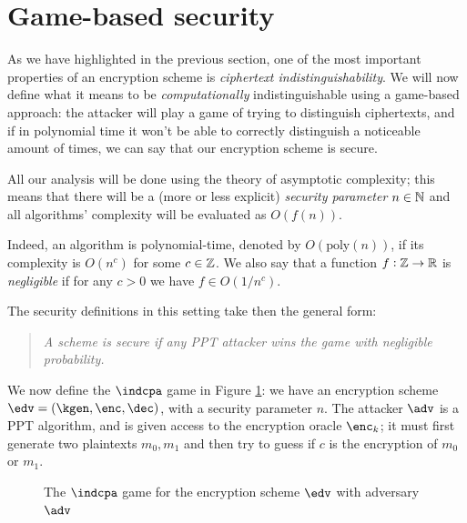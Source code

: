 \section{Game-based security}
As we have highlighted in the previous section, one of the most important properties of an encryption scheme is \emph{ciphertext indistinguishability}. We will now define what it means to be \emph{computationally} indistinguishable using a game-based approach: the attacker will play a game of trying to distinguish ciphertexts, and if in polynomial time it won't be able to correctly distinguish a noticeable amount of times, we can say that our encryption scheme is secure.

All our analysis will be done using the theory of asymptotic complexity; this means that there will be a (more or less explicit) \emph{security parameter} $n\in\mathbb{N}$ and all algorithms' complexity will be evaluated as $O(f(n))$.

Indeed, an algorithm is polynomial-time, denoted by $O(\text{poly}(n))$, if its complexity is $O(n^c)$ for some $c\in\mathbb{Z}$. We also say that a function $f:\mathbb{Z}\to\mathbb{R}$ is \emph{negligible} if for any $c>0$ we have $f\in O(1/n^c)$.

The security definitions in this setting take then the general form:

\begin{quote}
    \textit{A scheme is \emph{secure} if any PPT attacker wins the game with negligible probability.}
\end{quote}

We now define the $\indcpa$ game in Figure \ref{game_indcpa}: we have an encryption scheme $\edv=(\kgen,\enc,\dec)$, with a security parameter $n$. The attacker $\adv$ is a PPT algorithm, and is given access to the encryption oracle $\enc_k$; it must first generate two plaintexts $m_0,m_1$ and then try to guess if $c$ is the encryption of $m_0$ or $m_1$.

\begin{figure}
    \caption{The $\indcpa$ game for the encryption scheme $\edv$ with adversary $\adv$}
    \label{game_indcpa}
\end{figure}

